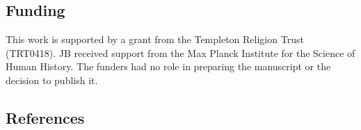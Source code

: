 \documentclass[
  singlecolumn,
  9pt]{article}
\newlength{\cslentryspacing}
\begin{document}
\newpage{}

\subsection{Funding}\label{funding}

This work is supported by a grant from the Templeton Religion Trust
(TRT0418). JB received support from the Max Planck Institute for the
Science of Human History. The funders had no role in preparing the
manuscript or the decision to publish it.

\subsection{References}\label{references}

\label{refs}
\setlength{\cslentryspacing}{0em}
\end{document}
